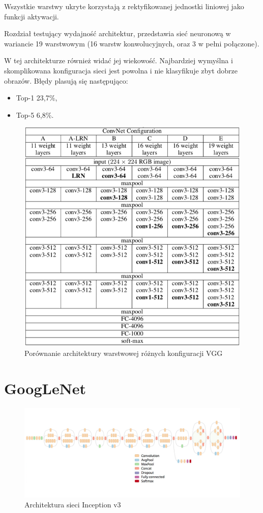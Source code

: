 \documentclass[12pt,a4paper,twoside,titlepage,openright]{book}
\begin{document}
Wszystkie warstwy ukryte korzystają z rektyfikowanej jednostki liniowej jako funkcji aktywacji.

Rozdział testujący wydajność architektur, przedstawia sieć neuronową w wariancie 19 warstwowym (16 warstw konwolucyjnych, oraz 3 w pełni połączone).

W tej architekturze również widać jej wiekowość. Najbardziej wymyślna i skomplikowana konfiguracja sieci jest powolna i nie klasyfikuje zbyt dobrze obrazów. Błędy plasują się następująco:
\begin{itemize}
\item Top-1 23,7\%,
\item Top-5 6,8\%.
\end{itemize}
\cite{DBLP:journals/corr/SimonyanZ14a}

\begin{figure}[ht]
	\centering
			\includegraphics[resolution=100, scale=0.8]{vggArchComparison.png}
		\caption{Porównanie architektury warstwowej różnych konfiguracji VGG}
\end{figure}


\section{GoogLeNet}
\begin{figure}[h]
	\centering
			\includegraphics[resolution=100, scale=0.36]{inceptionv3architecture.png}
		\caption{Architektura sieci Inception v3}
\end{figure}
\end{document}
